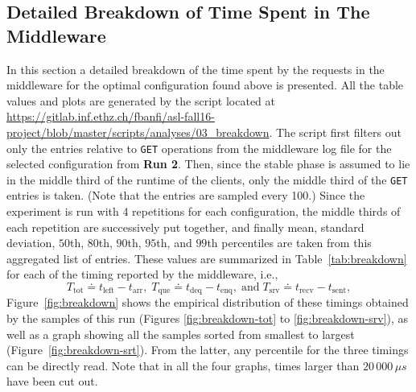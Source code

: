 \documentclass[11pt]{article}
\theoremstyle{definition}
\newcommand\gr[1]{{\color[HTML]{11aa11}#1}}
\newcommand\Tarr{t_{\mathrm{arr}}}
\newcommand\Tenq{t_{\mathrm{enq}}}
\newcommand\Tdeq{t_{\mathrm{deq}}}
\newcommand\Tsent{t_{\mathrm{sent}}}
\newcommand\Trecv{t_{\mathrm{recv}}}
\newcommand\Tleft{t_{\mathrm{left}}}
\newcommand\Ttot{T_{\mathrm{tot}}}
\newcommand\Tque{T_{\mathrm{que}}}
\newcommand\Tsrv{T_{\mathrm{srv}}}
\renewcommand\t\texttt
\begin{document}
\vspace{-4mm} %

\subsection{Detailed Breakdown of Time Spent in The Middleware}
\label{ssec:03_breakdown}

In this section a detailed breakdown of the time spent by the requests in the middleware for the optimal configuration found above is presented.
All the table values and plots are generated by the script located at \url{https://gitlab.inf.ethz.ch/fbanfi/asl-fall16-project/blob/master/scripts/analyses/03_breakdown}.
The script first filters out only the entries relative to \t{GET} operations from the middleware log file for the selected configuration from \gr{\bf Run 2}.
Then, since the stable phase is assumed to lie in the middle third of the runtime of the clients, only the middle third of the \t{GET} entries is taken.
(Note that the entries are sampled every 100.)
Since the experiment is run with 4 repetitions for each configuration, the middle thirds of each repetition are successively put together, and finally mean, standard deviation, $50$th, $80$th, $90$th, $95$th, and $99$th percentiles are taken from this aggregated list of entries.
These values are summarized in Table~\ref{tab:breakdown} for each of the timing reported by the middleware, i.e.,
\begin{equation}
    \label{eqn:times}
    \Ttot\doteq\Tleft-\Tarr,\;\Tque\doteq\Tdeq-\Tenq,\;\text{and}\;\Tsrv\doteq\Trecv-\Tsent,
\end{equation}
Figure~\ref{fig:breakdown} shows the empirical distribution of these timings obtained by the samples of this run (Figures \ref{fig:breakdown-tot} to \ref{fig:breakdown-srv}), as well as a graph showing all the samples sorted from smallest to largest (Figure~\ref{fig:breakdown-srt}).
From the latter, any percentile for the three timings can be directly read.
Note that in all the four graphs, times larger than $20\,000\,\mu s$ have been cut out.
\end{document}
